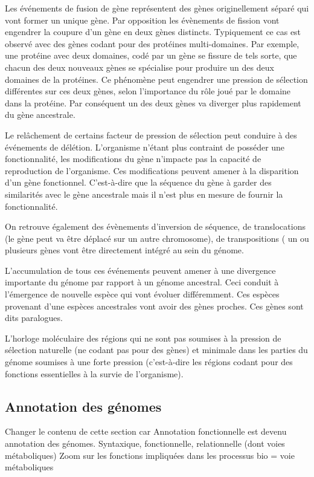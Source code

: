 \begin{refsegment}
    Les événements de fusion de gène représentent des gènes originellement séparé qui vont former un unique gène. Par opposition les évènements de fission vont  engendrer la coupure d’un gène en deux gènes distincts. Typiquement ce cas est observé avec des gènes codant pour des protéines multi-domaines. Par exemple, une protéine avec deux domaines, codé par un gène se fissure de tels sorte, que chacun des deux nouveaux gènes se spécialise pour produire un des deux domaines de la protéines. Ce phénomène peut engendrer une pression de sélection différentes sur ces deux gènes, selon l’importance du rôle joué par le domaine dans la protéine. Par conséquent un des deux gènes va diverger plus rapidement du gène ancestrale.
    
    Le relâchement de certains facteur de pression de sélection peut conduire à des événements de délétion. L’organisme n’étant plus contraint de posséder une fonctionnalité, les modifications du gène n’impacte pas la capacité de reproduction de l’organisme. Ces modifications peuvent amener à la disparition d’un gène fonctionnel. C’est-à-dire que la séquence du gène à garder des similarités avec le gène ancestrale mais il n’est plus en mesure de fournir la fonctionnalité.
    
    On retrouve également des évènements d’inversion de séquence, de translocations (le gène peut va être déplacé sur un autre chromosome), de transpositions ( un ou plusieurs gènes vont être directement intégré au sein du génome.
    
    L’accumulation de tous ces événements peuvent amener  à une divergence importante du génome par rapport à un génome ancestral. Ceci conduit à l’émergence de nouvelle espèce qui vont évoluer différemment. Ces espèces provenant d’une espèces ancestrales vont avoir des gènes proches. Ces gènes sont dits paralogues.
    
    L’horloge moléculaire des régions qui ne sont pas soumises à la pression de sélection naturelle (ne codant pas pour des gènes) et minimale dans les parties du génome soumises à une forte pression (c'est-à-dire les régions codant pour des fonctions essentielles à la survie de l'organisme).
    
    
    \subsection{Annotation des génomes}
    Changer le contenu de cette section car Annotation fonctionnelle est devenu annotation des génomes.
    Syntaxique, fonctionnelle, relationnelle (dont voies métaboliques) Zoom sur les fonctions impliquées dans les processus bio = voie métaboliques
    

\end{refsegment}
